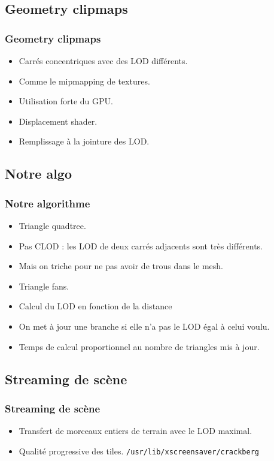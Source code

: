\documentclass{beamer}
\begin{document}
\subsection{Geometry clipmaps}
\begin{frame}
  \frametitle{Geometry clipmaps}
  \begin{itemize}
  \item Carrés concentriques avec des LOD différents.
  \item Comme le mipmapping de textures.
  \item Utilisation forte du GPU.
  \item Displacement shader.
  \item Remplissage à la jointure des LOD.
  \end{itemize}
\end{frame}

\subsection{Notre algo}
\begin{frame}
  \frametitle{Notre algorithme}
  \begin{itemize}
  \item Triangle quadtree.
  \item Pas CLOD : les LOD de deux carrés adjacents sont très différents.
  \item Mais on triche pour ne pas avoir de trous dans le mesh.
  \item Triangle fans.
  \item Calcul du LOD en fonction de la distance
  \item On met à jour une branche si elle n'a pas le LOD égal à celui voulu.
  \item Temps de calcul proportionnel au nombre de triangles mis à jour.
  \end{itemize}
\end{frame}


\subsection{Streaming de scène}
\begin{frame}
  \frametitle{Streaming de scène}
  \begin{itemize}
  \item Transfert de morceaux entiers de terrain avec le LOD maximal.
  \item Qualité progressive des tiles.
  \texttt{/usr/lib/xscreensaver/crackberg}
  \end{itemize}
\end{frame}
\end{document}
